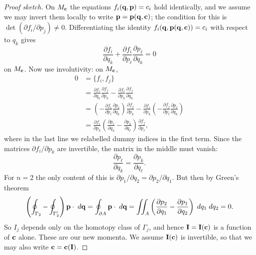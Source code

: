 \documentclass[a4paper]{scrartcl}
\begin{document}
\begin{proof}[Proof sketch]
	On $M_{\mathbf{c}}$ the equations $f_i(\mathbf{q}, \mathbf{p}) = c_i$ hold identically, and we assume we may invert them locally to write $\mathbf{p} = \mathbf{p}(\mathbf{q}, \mathbf{c})$; the condition for this is $\det(\partial f_i/\partial p_j)\neq 0$. Differentiating the identity $f_i(\mathbf{q}, \mathbf{p}(\mathbf{q}, \mathbf{c})) = c_i$ with respect to $q_k$ gives
	$$
	\frac{\partial f_i}{\partial q_k} + \frac{\partial f_i}{\partial p_\ell}\frac{\partial p_\ell}{\partial q_k} = 0
	$$
	on $M_{\mathbf{c}}$. Now use involutivity: on $M_{\mathbf{c}}$,
	\begin{align*}
		0 &= \{f_i, f_j\}\\
		&= \frac{\partial f_i}{\partial q_k}\frac{\partial f_j}{\partial p_k} - \frac{\partial f_i}{\partial p_k}\frac{\partial f_j}{\partial q_k}\\
		&= \left(-\frac{\partial f_i}{\partial p_\ell}\frac{\partial p_\ell}{\partial q_k}\right)\frac{\partial f_j}{\partial p_k} - \frac{\partial f_i}{\partial p_k}\left(-\frac{\partial f_j}{\partial p_\ell}\frac{\partial p_\ell}{\partial q_k}\right)\\
		&= \frac{\partial f_i}{\partial p_k}\left(\frac{\partial p_\ell}{\partial q_k} - \frac{\partial p_k}{\partial q_\ell}\right)\frac{\partial f_j}{\partial p_\ell},
	\end{align*}
	where in the last line we relabelled dummy indices in the first term. Since the matrices $\partial f_i/\partial p_k$ are invertible, the matrix in the middle must vanish:
	$$
	\frac{\partial p_\ell}{\partial q_k} = \frac{\partial p_k}{\partial q_\ell}.
	$$
	For $n = 2$ the only content of this is $\partial p_1/\partial q_2 = \partial p_2/\partial q_1$. But then by Green's theorem
	$$
	\left(\oint_{\Gamma_2} - \oint_{\Gamma_2'}\right)\mathbf{p}\cdot\; d\mathbf{q} = \oint_{\partial A}\mathbf{p}\cdot\; d\mathbf{q} = \iint_A\left(\frac{\partial p_2}{\partial q_1} - \frac{\partial p_1}{\partial q_2}\right)\; d q_1 \; d q_2 = 0.
	$$
	So $I_j$ depends only on the homotopy class of $\Gamma_j$, and hence $\mathbf{I} = \mathbf{I}(\mathbf{c})$ is a function of $\mathbf{c}$ alone. These are our new momenta. We assume $\mathbf{I}(\mathbf{c})$ is invertible, so that we may also write $\mathbf{c} = \mathbf{c}(\mathbf{I})$.


\end{proof}
\end{document}
